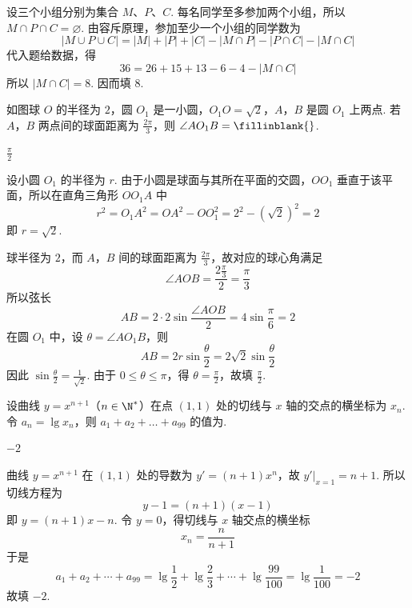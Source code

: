 \begin{solution}
设三个小组分别为集合 \(M\)、\(P\)、\(C\). 每名同学至多参加两个小组，所以 \(M\cap P\cap C=\varnothing\). 由容斥原理，参加至少一个小组的同学数为
\[
|M\cup P\cup C|=|M|+|P|+|C|-|M\cap P|-|P\cap C|-|M\cap C|
\]
代入题给数据，得
\[
36=26+15+13-6-4-|M\cap C|
\]
所以 \(|M\cap C|=8\). 因而填 \(8\).
\end{solution}

\begin{problem}
如图球 \(O\) 的半径为 \(2\)，圆 \(O_{1}\) 是一小圆，\(O_{1}O = \sqrt{2}\)，\(A\)，\(B\) 是圆 \(O_{1}\) 上两点. 若 \(A\)，\(B\) 两点间的球面距离为 \(\frac{2\pi}{3}\)，则 \(\angle AO_{1}B =\fillinblank{}\).


\end{problem}

\begin{answer}
\(\frac{\pi}{2}\)
\end{answer}

\begin{solution}
设小圆 \(O_{1}\) 的半径为 \(r\). 由于小圆是球面与其所在平面的交圆，\(OO_{1}\) 垂直于该平面，所以在直角三角形 \(OO_{1}A\) 中
\[
r^{2}=O_{1}A^{2}=OA^{2}-OO_{1}^{2}=2^{2}-\left(\sqrt{2}\right)^{2}=2
\]
即 \(r=\sqrt{2}\).

球半径为 \(2\)，而 \(A\)，\(B\) 间的球面距离为 \(\frac{2\pi}{3}\)，故对应的球心角满足
\[
\angle AOB=\frac{2\frac{\pi}{3}}{2}=\frac{\pi}{3}
\]
所以弦长
\[
AB=2\cdot2\sin\frac{\angle AOB}{2}=4\sin\frac{\pi}{6}=2
\]
在圆 \(O_{1}\) 中，设 \(\theta=\angle AO_{1}B\)，则
\[
AB=2r\sin\frac{\theta}{2}=2\sqrt{2}\sin\frac{\theta}{2}
\]
因此 \(\sin\frac{\theta}{2}=\frac{1}{\sqrt{2}}\). 由于 \(0\leqslant\theta\leqslant\pi\)，得 \(\theta=\frac{\pi}{2}\)，故填 \(\frac{\pi}{2}\).
\end{solution}

\begin{problem}
设曲线 \( y = x^{n + 1} \)（\(n \in \N^*\)）在点 \(\left(1,1\right)\) 处的切线与 \(x\) 轴的交点的横坐标为 \( x_n \). 令 \( a_n = \lg x_n \)，则 \( a_1 + a_2 + \dots + a_{99} \) 的值为\fillinblank{}.

\end{problem}

\begin{answer}
\(-2\)
\end{answer}

\begin{solution}
曲线 \(y=x^{n+1}\) 在 \(\left(1,1\right)\) 处的导数为
\(y'=(n+1)x^{n}\)，故 \(y'\big|_{x=1}=n+1\).
所以切线方程为
\[
y-1=(n+1)\left(x-1\right)
\]
即 \(y=(n+1)x-n\). 令 \(y=0\)，得切线与 \(x\) 轴交点的横坐标
\[
x_{n}=\frac{n}{n+1}
\]
于是
\[
a_{1}+a_{2}+\cdots+a_{99}
=\lg\frac{1}{2}+\lg\frac{2}{3}+\cdots+\lg\frac{99}{100}
=\lg\frac{1}{100}=-2
\]
故填 \(-2\).
\end{solution}


